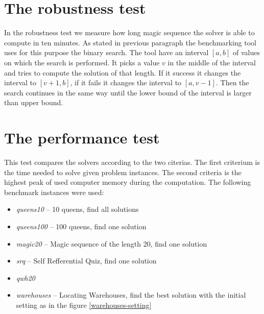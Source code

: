 \section{The robustness test}
In the robustness test we measure how long magic sequence the solver is able to compute in 
ten minutes. As stated in previous paragraph the benchmarking tool uses for this 
purpose the binary search. The tool have an interval $[a,b]$ of values on which the search 
is performed. It picks a value $v$ in the middle of the interval and tries to compute
the solution of that length. If it success it changes the interval to $[v+1,b]$, if 
it fails it changes the interval to $[a,v-1]$. Then the search continues in the same way
until the lower bound of the interval is larger than upper bound.

\section{The performance test}
This test compares the solvers according to the two citerias. The first criterium is
the time needed to solve given problem instances. The second criteria is the highest
peak of used computer memory during the computation. The following benchmark instances 
were used:

\begin{itemize}
  \item {\em queens10} -- 10 queens, find all solutions
  \item {\em queens100} -- 100 queens, find one solution
  \item {\em magic20} -- Magic sequence of the length 20, find one solution
  \item {\em srq} -- Self Refferential Quiz, find one solution
  \item {\em qwh20}
  \item {\em warehouses} -- Locating Warehouses, find the best solution with the initial setting as in the figure \ref{warehouses-setting} 
\end{itemize}  